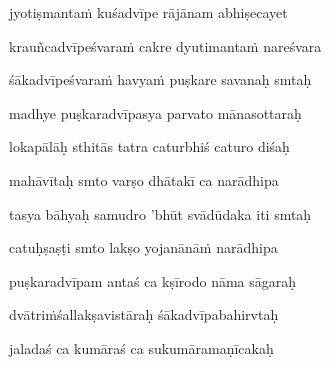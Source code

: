 jyotiṣmantaṁ kuśadvīpe rājānam abhiṣecayet \veg\dontdisplaylinenum
{}

krauñcadvīpeśvaraṁ cakre dyutimantaṁ nareśvara\thinspace{\dandab} \dontdisplaylinenum

śākadvīpeśvaraṁ havyaṁ puṣkare savanaḥ smtaḥ \veg\dontdisplaylinenum
{}

madhye puṣkaradvīpasya parvato mānasottaraḥ\thinspace{\dandab} \dontdisplaylinenum

lokapālāḥ sthitās tatra caturbhiś caturo diśaḥ \veg\dontdisplaylinenum
{}

mahāvītaḥ smto varṣo dhātakī ca narādhipa\thinspace{\dandab} \dontdisplaylinenum

tasya bāhyaḥ samudro 'bhūt svādūdaka iti smtaḥ \veg\dontdisplaylinenum
{}

catuḥṣaṣṭi smto lakṣo yojanānāṁ narādhipa\thinspace{\dandab} \dontdisplaylinenum

puṣkaradvīpam antaś ca kṣīrodo nāma sāgaraḥ \veg\dontdisplaylinenum
{}

dvātriṁśallakṣavistāraḥ śākadvīpabahirvtaḥ\thinspace{\dandab} \dontdisplaylinenum

jaladaś ca kumāraś ca sukumāramaṇīcakaḥ \veg\dontdisplaylinenum
{}

